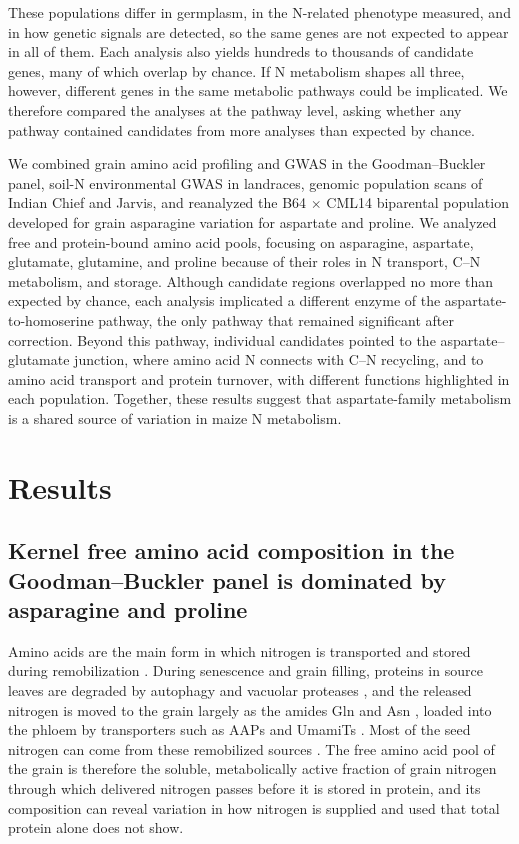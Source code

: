 \documentclass[namedate,unnumsec,webpdf,contemporary,large]{oup-authoring-template}
\begin{document}
These populations differ in germplasm, in the N-related phenotype measured, and in how genetic signals are detected, so the same genes are not expected to appear in all of them. Each analysis also yields hundreds to thousands of candidate genes, many of which overlap by chance. If N metabolism shapes all three, however, different genes in the same metabolic pathways could be implicated. We therefore compared the analyses at the pathway level, asking whether any pathway contained candidates from more analyses than expected by chance.

We combined grain amino acid profiling and GWAS in the Goodman--Buckler panel, soil-N environmental GWAS in landraces, genomic population scans of Indian Chief and Jarvis, and reanalyzed the B64 $\times$ CML14 biparental population developed for grain asparagine variation for aspartate and proline. We analyzed free and protein-bound amino acid pools, focusing on asparagine, aspartate, glutamate, glutamine, and proline because of their roles in N transport, C--N metabolism, and storage. Although candidate regions overlapped no more than expected by chance, each analysis implicated a different enzyme of the aspartate-to-homoserine pathway, the only pathway that remained significant after correction. Beyond this pathway, individual candidates pointed to the aspartate--glutamate junction, where amino acid N connects with C--N recycling, and to amino acid transport and protein turnover, with different functions highlighted in each population. Together, these results suggest that aspartate-family metabolism is a shared source of variation in maize N metabolism.

\section{Results}

\subsection{Kernel free amino acid composition in the Goodman--Buckler panel is dominated by asparagine and proline}

Amino acids are the main form in which nitrogen is transported and stored during remobilization \citep{masclaux2010nitrogen, santiago2020amino}. During senescence and grain filling, proteins in source leaves are degraded by autophagy and vacuolar proteases \citep{potter2026chloroplast}, and the released nitrogen is moved to the grain largely as the amides Gln and Asn \citep{teixeira2026amino}, loaded into the phloem by transporters such as AAPs and UmamiTs \citep{santiago2020amino}. Most of the seed nitrogen can come from these remobilized sources \citep{masclaux2010nitrogen}. The free amino acid pool of the grain is therefore the soluble, metabolically active fraction of grain nitrogen through which delivered nitrogen passes before it is stored in protein, and its composition can reveal variation in how nitrogen is supplied and used that total protein alone does not show.
\end{document}

